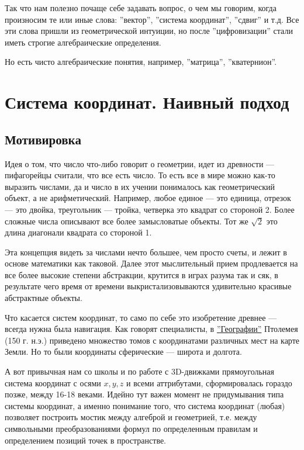 \documentclass[a4paper,12pt]{article}
\newcounter{z-counter}
\begin{document}
Так что нам полезно почаще себе задавать вопрос, о чем мы говорим, когда произносим те или иные слова: ''вектор'', ''система координат'', ''сдвиг'' и т.д. Все эти слова пришли из геометрической интуиции, но после ''цифровизации'' стали иметь строгие алгебраические определения.

Но есть чисто алгебраические понятия, например, ''матрица'', ''кватернион''.

\section*{Система координат. Наивный подход}
\subsection*{Мотивировка}
Идея о том, что число что-либо говорит о геометрии, идет из древности --- пифагорейцы считали, что все есть число. То есть все в мире можно как-то выразить числами, да и число в их учении понималось как геометрический объект, а не арифметический. Например, любое единое --- это единица, отрезок --- это двойка, треугольник --- тройка, четверка это квадрат со стороной 2. Более сложные числа описывают все более замысловатые объекты. Тот же $\sqrt{2}$ это длина диагонали квадрата со стороной 1.

Эта концепция видеть за числами нечто большее, чем просто счеты, и лежит в основе математики как таковой. Далее этот мыслительный прием продлевается на все более высокие степени абстракции, крутится в играх разума так и сяк, в результате чего время от времени выкристализовываются удивительно красивые абстрактные объекты.

Что касается систем координат, то само по себе это изобретение древнее --- всегда нужна была навигация. Как говорят специалисты, в \href{https://ru.wikipedia.org/wiki/%D0%93%D0%B5%D0%BE%D0%B3%D1%80%D0%B0%D1%84%D0%B8%D1%8F_(%D0%9F%D1%82%D0%BE%D0%BB%D0%B5%D0%BC%D0%B5%D0%B9)}{''Географии''} Птолемея (150 г. н.э.) приведено множество томов с координатами различных мест на карте Земли. Но то были координаты сферические --- широта и долгота.

А вот привычная нам со школы и по работе с 3D-движками прямоугольная система координат с осями $x,y,z$ и всеми аттрибутами, сформировалась гораздо позже, между 16-18 веками. Идейно тут важен момент не придумывания типа системы координат, а именно понимание того, что система координат (любая) позволяет построить мостик между алгеброй и геометрией, т.е. между символьными преобразованиями формул по определенным правилам и определением позиций точек в пространстве.
\end{document}
